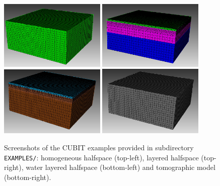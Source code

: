 \begin{figure}[htbp]
\noindent \begin{centering}
\includegraphics[width=0.45\textwidth]{figures/example-homogeneous.jpg}
\includegraphics[width=0.45\textwidth]{figures/example-2layers.jpg} \\
\includegraphics[width=0.45\textwidth]{figures/example-water.jpg} 
\includegraphics[width=0.45\textwidth]{figures/example-tomo.jpg}
\par\end{centering}

\caption{Screenshots of the CUBIT examples provided in subdirectory \texttt{EXAMPLES/}:
homogeneous halfspace (top-left), layered halfspace (top-right), water
layered halfspace (bottom-left) and tomographic model (bottom-right).}


\label{fig:examples.cubit}
\end{figure}


